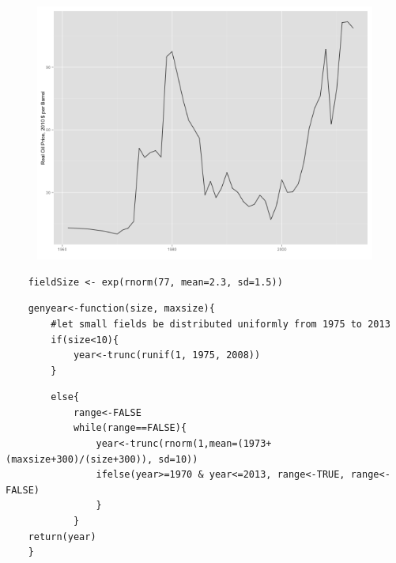 \documentclass{beamer}
\begin{document}
\begin{figure}
	\includegraphics[width=1\textwidth]{figures/oil_price_series.png}
	\label{oil_price_series}	
\end{figure}


\begin{frame}
	\begin{verbatim}
	fieldSize <- exp(rnorm(77, mean=2.3, sd=1.5))
	\end{verbatim}
\end{frame}


\begin{frame}
	\small \begin{verbatim}
	genyear<-function(size, maxsize){
		#let small fields be distributed uniformly from 1975 to 2013
		if(size<10){
			year<-trunc(runif(1, 1975, 2008))	
		} 
	\end{verbatim}
\end{frame}





\begin{frame}
	\small \begin{verbatim}
		else{
			range<-FALSE
			while(range==FALSE){
				year<-trunc(rnorm(1,mean=(1973+(maxsize+300)/(size+300)), sd=10))
				ifelse(year>=1970 & year<=2013, range<-TRUE, range<-FALSE)
				}	
			}
	return(year)
	}
	\end{verbatim}	
\end{frame}
\end{document}
